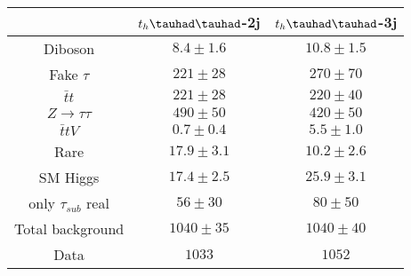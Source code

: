 \begin{table}[htbp]
\begin{tabular}{ccc} \toprule\toprule
& $t_{h}\thadhad$-2j & $t_{h}\thadhad$-3j\\\midrule

  Diboson                  & $8.4 \pm 1.6  $ & $ 10.8 \pm 1.5 $\\ 
  Fake $\tau$              & $221 \pm 28   $ & $ 270 \pm 70   $\\ 
  $\bar{t}t$               & $221 \pm 28   $ & $ 220 \pm 40   $\\ 
  $Z\rightarrow\tau\tau$   & $490 \pm 50   $ & $ 420 \pm 50   $\\ 
  $\bar{t}tV$              & $0.7 \pm 0.4  $ & $ 5.5 \pm 1.0  $\\ 
  Rare                     & $17.9 \pm 3.1 $ & $ 10.2 \pm 2.6 $\\ 
  SM Higgs                 & $17.4 \pm 2.5 $ & $ 25.9 \pm 3.1 $\\ 
  only $\tau_{sub}$ real   & $56 \pm 30    $ & $ 80 \pm 50    $ \\ \midrule 
  Total background         & $1040 \pm 35  $ & $ 1040 \pm 40  $\\ \midrule 
  Data                     & $1033         $ & $ 1052         $\\ 
\bottomrule\bottomrule
\end{tabular}
\label{tab:HtautauPostfitYieldsUnblind}
\end{table} 









